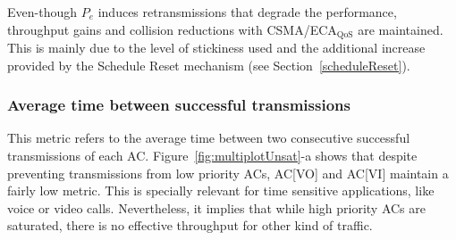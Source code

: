 \begin{itemize}
%

Even-though $P_e$ induces retransmissions that degrade the performance, throughput gains and collision reductions with CSMA/ECA$_{\text{QoS}}$ are maintained. This is mainly due to the level of stickiness used and the additional increase provided by the Schedule Reset mechanism (see Section~\ref{scheduleReset}).


%

\end{itemize}

\subsubsection{Average time between successful transmissions}
This metric refers to the average time between two consecutive successful transmissions of each AC. Figure~\ref{fig:multiplotUnsat}-a shows that despite preventing transmissions from low priority ACs, AC[VO] and AC[VI] maintain a fairly low metric. This is specially relevant for time sensitive applications, like voice or video calls. Nevertheless, it implies that while high priority ACs are saturated, there is no effective throughput for other kind of traffic.

